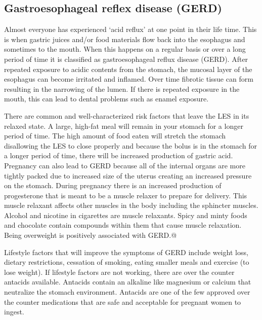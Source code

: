 \documentclass{tufte-handout}
\begin{document}
\subsection{Gastroesophageal reflex disease (GERD)}
Almost everyone has experienced ‘acid reflux' at one point in their life time. This is when gastric juices and/or food materials flow back into the esophagus and sometimes to the mouth. When this happens on a regular basis or over a long period of time it is classified as gastroesophageal reflux disease (GERD). After repeated exposure to acidic contents from the stomach, the mucosal layer of the esophagus can become irritated and inflamed. Over time fibrotic tissue can form resulting in the narrowing of the lumen. If there is repeated exposure in the mouth, this can lead to dental problems such as enamel exposure. 

 There are common and well-characterized risk factors that leave the LES in its relaxed state. A large, high-fat meal will remain in your stomach for a longer period of time. The high amount of food eaten will stretch the stomach disallowing the LES to close properly and because the bolus is in the stomach for a longer period of time, there will be increased production of gastric acid. Pregnancy can also lead to GERD because all of the internal organs are more tightly packed due to increased size of the uterus creating an increased pressure on the stomach. During pregnancy there is an increased production of progesterone that is meant to be a muscle relaxer to prepare for delivery. This muscle relaxant affects other muscles in the body including the sphincter muscles. Alcohol and nicotine in cigarettes are muscle relaxants. Spicy and minty foods and chocolate contain compounds within them that cause muscle relaxation. Being overweight is positively associated with GERD.@ 

 Lifestyle factors that will improve the symptoms of GERD include weight loss, dietary restrictions, cessation of smoking, eating smaller meals and exercise (to lose weight). If lifestyle factors are not working, there are over the counter antacids available. Antacids contain an alkaline like magnesium or calcium that neutralize the stomach environment. Antacids are one of the few approved over the counter medications that are safe and acceptable for pregnant women to ingest.
\end{document}
